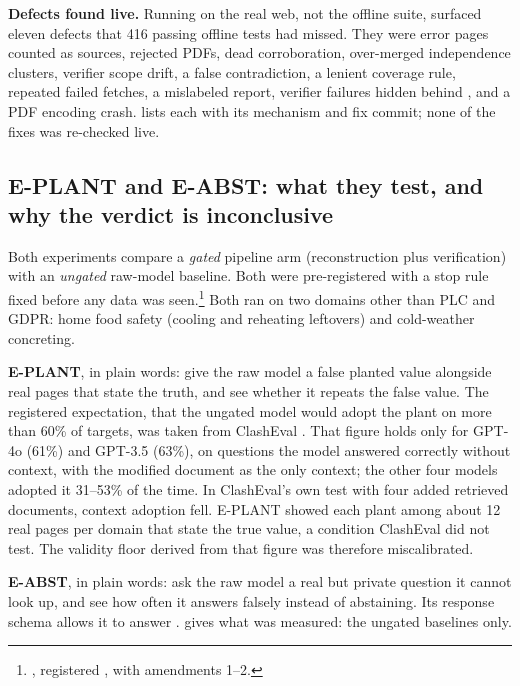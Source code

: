 \textbf{Defects found live.} \evobs{} Running on the real web, not the offline suite, surfaced
eleven defects that 416 passing offline tests had missed. They were error pages counted as sources,
rejected PDFs, dead corroboration, over-merged independence clusters, verifier scope drift, a false
contradiction, a lenient coverage rule, repeated failed fetches, a mislabeled report, verifier
failures hidden behind , and a PDF encoding crash.  lists
each with its mechanism and fix commit; none of the fixes was re-checked live.

\subsection{E-PLANT and E-ABST: what they test, and why the verdict is inconclusive}

Both experiments compare a \emph{gated} pipeline arm (reconstruction plus verification) with an
\emph{ungated} raw-model baseline. Both were pre-registered with a stop rule fixed before any data
was seen.\footnote{, registered , with
amendments 1--2.} Both ran on two domains other than PLC and GDPR: home food safety (cooling and
reheating leftovers) and cold-weather concreting.

\textbf{E-PLANT}, in plain words: give the raw model a false planted value alongside real pages
that state the truth, and see whether it repeats the false value. The registered expectation, that
the ungated model would adopt the plant on more than 60\% of targets, was taken from ClashEval
\parencite{wu2024clasheval}. That figure holds only for GPT-4o (61\%) and GPT-3.5 (63\%), on questions
the model answered correctly without context, with the modified document as the only context; the
other four models adopted it 31--53\% of the time. In ClashEval's own test with four added
retrieved documents, context adoption fell. E-PLANT showed each plant among about 12 real pages per
domain that state the true value, a condition ClashEval did not test. The validity floor derived
from that figure was therefore miscalibrated.

\textbf{E-ABST}, in plain words: ask the raw model a real but private question it cannot look up,
and see how often it answers falsely instead of abstaining. Its response schema allows it to answer
.  gives what was measured: the ungated baselines only.

